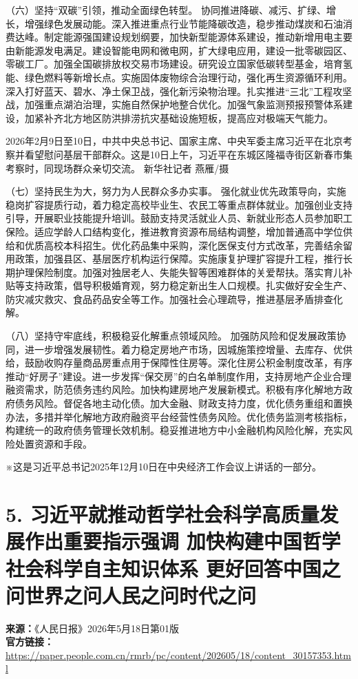 \documentclass[UTF8,zihao=-4]{ctexart}
\begin{document}
（六）坚持“双碳”引领，推动全面绿色转型。 协同推进降碳、减污、扩绿、增长，增强绿色发展动能。深入推进重点行业节能降碳改造，稳步推动煤炭和石油消费达峰。制定能源强国建设规划纲要，加快新型能源体系建设，推动新增用电主要由新能源发电满足。建设智能电网和微电网，扩大绿电应用，建设一批零碳园区、零碳工厂。加强全国碳排放权交易市场建设。研究设立国家低碳转型基金，培育氢能、绿色燃料等新增长点。实施固体废物综合治理行动，强化再生资源循环利用。深入打好蓝天、碧水、净土保卫战，强化新污染物治理。扎实推进“三北”工程攻坚战，加强重点湖泊治理，实施自然保护地整合优化。加强气象监测预报预警体系建设，加紧补齐北方地区防洪排涝抗灾基础设施短板，提高应对极端天气能力。

2026年2月9日至10日，中共中央总书记、国家主席、中央军委主席习近平在北京考察并看望慰问基层干部群众。这是10日上午，习近平在东城区隆福寺街区新春市集考察时，同现场群众亲切交流。 新华社记者 燕雁/摄

（七）坚持民生为大，努力为人民群众多办实事。 强化就业优先政策导向，实施稳岗扩容提质行动，着力稳定高校毕业生、农民工等重点群体就业。加强创业支持引导，开展职业技能提升培训。鼓励支持灵活就业人员、新就业形态人员参加职工保险。适应学龄人口结构变化，推进教育资源布局结构调整，增加普通高中学位供给和优质高校本科招生。优化药品集中采购，深化医保支付方式改革，完善结余留用政策，加强县区、基层医疗机构运行保障。实施康复护理扩容提升工程，推行长期护理保险制度。加强对独居老人、失能失智等困难群体的关爱帮扶。落实育儿补贴等支持政策，倡导积极婚育观，努力稳定新出生人口规模。扎实做好安全生产、防灾减灾救灾、食品药品安全等工作。加强社会心理疏导，推进基层矛盾排查化解。

（八）坚持守牢底线，积极稳妥化解重点领域风险。 加强防风险和促发展政策协同，进一步增强发展韧性。着力稳定房地产市场，因城施策控增量、去库存、优供给，鼓励收购存量商品房重点用于保障性住房等。深化住房公积金制度改革，有序推动“好房子”建设。进一步发挥“保交房”的白名单制度作用，支持房地产企业合理融资需求，防范债务违约风险。加快构建房地产发展新模式。积极有序化解地方政府债务风险。督促各地主动化债。加大金融、财政支持力度，优化债务重组和置换办法，多措并举化解地方政府融资平台经营性债务风险。优化债务监测考核指标，构建统一的政府债务管理长效机制。稳妥推进地方中小金融机构风险化解，充实风险处置资源和手段。

※这是习近平总书记2025年12月10日在中央经济工作会议上讲话的一部分。

\clearpage
\section*{5. 习近平就推动哲学社会科学高质量发展作出重要指示强调 加快构建中国哲学社会科学自主知识体系 更好回答中国之问世界之问人民之问时代之问}
\noindent\textbf{来源：}《人民日报》2026年5月18日第01版\\
\noindent\textbf{官方链接：}
\noindent\url{https://paper.people.com.cn/rmrb/pc/content/202605/18/content_30157353.html}
\end{document}
